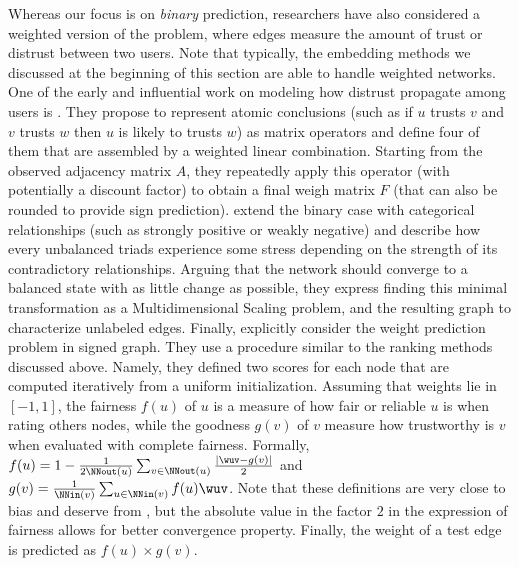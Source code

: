 Whereas our focus is on \emph{binary} prediction, researchers have also considered a weighted
version of the problem, where edges measure the amount of trust or distrust between two users. Note
that typically, the embedding methods we discussed at the beginning of this section are able to
handle weighted networks.
%
One of the early and influential work on modeling how distrust propagate among users is
\autocite{guha2004propagation}. They propose to represent atomic conclusions (such as if $u$ trusts
$v$ and $v$ trusts $w$ then $u$ is likely to trusts $w$) as matrix operators and define four of them
that are assembled by a weighted linear combination. Starting from the observed adjacency matrix
$A$, they repeatedly apply this operator (with potentially a discount factor) to obtain a final
weigh matrix $F$ (that can also be rounded to provide sign prediction).
%
\Textcite{Qian2014sn} extend the binary case with categorical relationships (such as strongly
positive or weakly negative) and describe how every unbalanced triads experience some stress
depending on the strength of its contradictory relationships. Arguing that the network should
converge to a balanced state with as little change as possible, they express finding this minimal
transformation as a Multidimensional Scaling problem, and the resulting graph to characterize
unlabeled edges.
%
Finally, \textcite{edgeWeights16} explicitly consider the weight prediction problem in signed graph.
They use a procedure similar to the ranking methods discussed above. Namely, they defined two scores
for each node that are computed iteratively from a uniform initialization. Assuming that weights lie
in $[-1,1]$, the fairness $f(u)$ of $u$ is a measure of how fair or reliable $u$ is when rating
others nodes, while the goodness $g(v)$ of $v$ measure how trustworthy is $v$ when evaluated with
complete fairness.  Formally, $f(u) =  1 - \frac{1}{2\NNout(u)} \sum_{v\in\NNout(u)}
\frac{|\wuv-g(v)|}{2}$ and $g(v) = \frac{1}{\NNin(v)}\sum_{u\in\NNin(v)}f(u)\wuv$. Note that these
definitions are very close to bias and deserve from \textcite{mishra2011finding}, but the absolute
value in the factor $2$ in the expression of fairness allows for better convergence property.
Finally, the weight of a test edge \euv is predicted as $f(u)\times g(v)$.

\medskip

